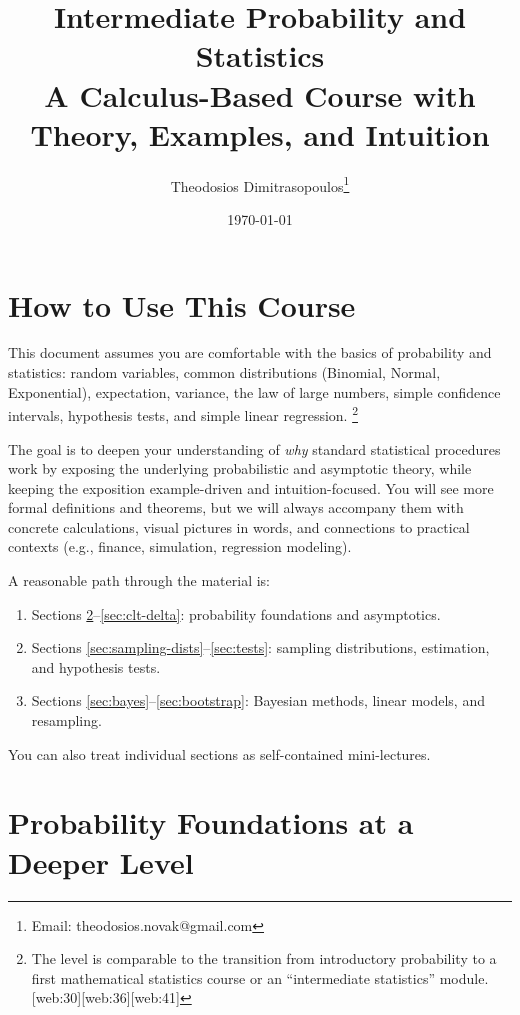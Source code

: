 \documentclass[11pt,a4paper]{article}
\title{Intermediate Probability and Statistics\\[0.5em]
       \large A Calculus-Based Course with Theory, Examples, and Intuition}
\author{Theodosios Dimitrasopoulos\footnote{Email: theodosios.novak@gmail.com}}
\date{\today}
\begin{document}
\maketitle
\tableofcontents
\newpage

\section{How to Use This Course}

This document assumes you are comfortable with the basics of probability and statistics: random variables, common distributions (Binomial, Normal, Exponential), expectation, variance, the law of large numbers, simple confidence intervals, hypothesis tests, and simple linear regression.%
\footnote{The level is comparable to the transition from introductory probability to a first mathematical statistics course or an ``intermediate statistics'' module.[web:30][web:36][web:41]}

The goal is to deepen your understanding of \emph{why} standard statistical procedures work by exposing the underlying probabilistic and asymptotic theory, while keeping the exposition example-driven and intuition-focused. 
You will see more formal definitions and theorems, but we will always accompany them with concrete calculations, visual pictures in words, and connections to practical contexts (e.g., finance, simulation, regression modeling).

\medskip
A reasonable path through the material is:
\begin{enumerate}
    \item Sections \ref{sec:prob-found}--\ref{sec:clt-delta}: probability foundations and asymptotics.
    \item Sections \ref{sec:sampling-dists}--\ref{sec:tests}: sampling distributions, estimation, and hypothesis tests.
    \item Sections \ref{sec:bayes}--\ref{sec:bootstrap}: Bayesian methods, linear models, and resampling.
\end{enumerate}
You can also treat individual sections as self-contained mini-lectures.

\newpage

\section{Probability Foundations at a Deeper Level}
\label{sec:prob-found}
\end{document}
